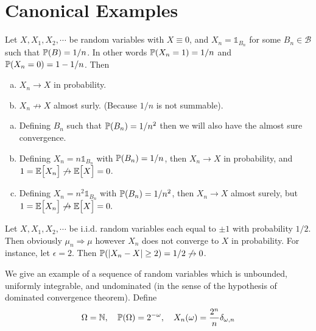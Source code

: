 \section{Canonical Examples}
\begin{example}
	Let $ X, X_1,X_2,\cdots $ be random variables with $ X\equiv 0 $, and $ X_n = \mathds{1}_{B_n} $ for some $ B_n \in \mathcal{B} $ such that $ \mathbb{P}(B)=1/n $. In other words $ \mathbb{P}(X_n = 1) = 1/n $ and $ \mathbb{P}(X_n=0) = 1-1/n $. Then 
	\begin{enumerate}[(a)]
		\item $ X_n \to X $ in probability.
		\item $ X_n \not\to X $ almost surly. (Because $ 1/n $ is not summable). 
	\end{enumerate}
\end{example}
\begin{remark}
	\begin{enumerate}[(a)]
		\item Defining $ B_n $ such that $ \mathbb{P}(B_n) =1/n^2 $ then we will also have the almost sure convergence.
		\item Defining $ X_n = n\mathds{1}_{B_n} $ with $ \mathbb{P}(B_n)=1/n $, then $ X_n\to X $ in probability, and $ 1 = \mathbb{E}\big[X_n\big] \not\to \mathbb{E}\big[X\big] = 0 $.
		\item Defining $ X_n = n^2\mathds{1}_{B_n} $ with $ \mathbb{P}(B_n)=1/n^2 $, then $ X_n\to X $ almost surely, but $ 1 = \mathbb{E}\big[X_n\big] \not\to \mathbb{E}\big[X\big] = 0. $
	\end{enumerate}
\end{remark}


\begin{example}
	Let $ X,X_1,X_2,\cdots $ be i.i.d. random variables each equal to $ \pm 1 $ with probability $ 1/2 $. Then obviously $ \mu_n \Rightarrow \mu $ however $ X_n $ does not converge to $ X $ in probability. For instance, let $ \epsilon=2 $. Then $ \mathbb{P}(|X_n-X|\geq 2) = 1/2 \not\to 0 $.
\end{example}


\begin{example}
	We give an example of a sequence of random variables which is unbounded, uniformly integrable, and undominated (in the sense of the hypothesis of dominated convergence theorem). Define
	\[ \Omega = \mathbb{N},\quad \mathbb{P}(\Omega)=2^{-\omega},\quad X_n(\omega) = \frac{2^n}{n}\delta_{\omega,n} \]
\end{example}


